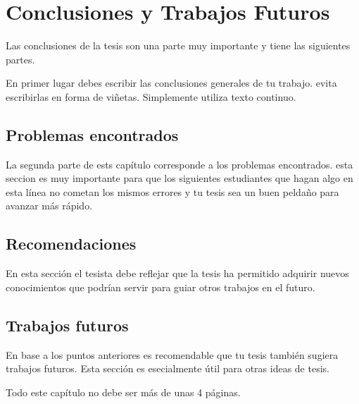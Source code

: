 \chapter{Conclusiones y Trabajos Futuros}\label{chap:conclusiones}

Las conclusiones de la tesis son una parte muy importante y tiene las siguientes partes.

En primer lugar debes escribir las conclusiones generales de tu trabajo. evita escribirlas en forma de viñetas. Simplemente utiliza texto continuo.

\section{Problemas encontrados}
La segunda  parte de ests capítulo corresponde a los problemas encontrados. esta seccion es muy importante para que los siguientes estudiantes que hagan algo en esta línea no cometan los mismos errores y tu tesis sea un buen peldaño para avanzar más rápido.

\section{Recomendaciones}
En esta sección el tesista debe reflejar que la tesis ha permitido adquirir nuevos conocimientos que podrían servir para guiar otros trabajos en el futuro.

\section{Trabajos futuros}
En base a los puntos anteriores es recomendable que tu tesis también sugiera trabajos futuros. Esta sección es esecialmente útil para otras ideas de tesis.

Todo este capítulo no debe ser más de unas 4 páginas.